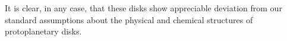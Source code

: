 It is clear, in any case, that these disks show appreciable deviation from our standard assumptions about the physical and chemical structures of protoplanetary disks.











